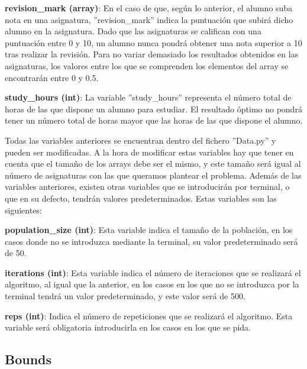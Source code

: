 \documentclass[11pt, a4paper, titlepage]{article}
\begin{document}
\textbf{revision\_mark (array)}: En el caso de que, según lo anterior, el alumno suba nota en una asignatura, ''revision\_mark'' indica la puntuación que subirá dicho alumno en la asignatura. Dado que las asignaturas se califican con una puntuación entre 0 y 10, un alumno nunca pondrá obtener una nota superior a 10 tras realizar la revisión. Para no variar demasiado los resultados obtenidos en las asignaturas, los valores entre los que se comprenden los elementos del array se encontrarán entre 0 y 0.5.

\vspace{5mm}

\textbf{study\_hours (int)}: La variable ''study\_hours'' representa el número total de horas de las que dispone un alumno para estudiar. El resultado óptimo no pondrá tener un número total de horas mayor que las horas de las que dispone el alumno.

\vspace{5mm}

Todas las variables anteriores se encuentran dentro del fichero ''Data.py'' y pueden ser modificadas. A la hora de modificar estas variables hay que tener en cuenta que el tamaño de los arrays debe ser el mismo, y este tamaño será igual al número de asignaturas con las que queramos plantear el problema. Además de las variables anteriores, existen otras variables que se introducirán por terminal, o que en su defecto, tendrán valores predeterminados. Estas variables son las siguientes: 

\vspace{5mm}

\textbf{population\_size (int)}: Esta variable indica el tamaño de la población, en los casos donde no se introduzca mediante la terminal, su valor predeterminado será de 50.

\vspace{5mm}

\textbf{iterations (int)}: Esta variable indica el número de iteraciones que se realizará el algoritmo, al igual que la anterior, en los casos en los que no se introduzca por la terminal tendrá un valor predeterminado, y este valor será de 500.

\vspace{5mm}

\textbf{reps (int)}: Indica el número de repeticiones que se realizará el algoritmo. Esta variable será obligatoria introducirla en los casos en los que se pida.

\subsection{Bounds}
\end{document}
